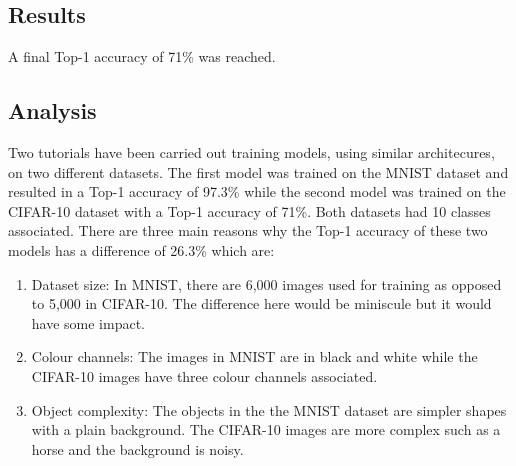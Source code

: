 \tocless\subsection{Results}
A final Top-1 accuracy of 71\% was reached.

\tocless\subsection{Analysis}
Two tutorials have been carried out training models, using similar architecures, on two different datasets.
The first model was trained on the MNIST dataset and resulted in a Top-1 accuracy of 97.3\% while the second model was trained on the CIFAR-10 dataset with a Top-1 accuracy of 71\%.
Both datasets had 10 classes associated.
There are three main reasons why the Top-1 accuracy of these two models has a difference of 26.3\% which are:
\begin{enumerate}
    \item{Dataset size: In MNIST, there are 6,000 images used for training as opposed to 5,000 in CIFAR-10. The difference here would be miniscule but it would have some impact.}
    \item{Colour channels: The images in MNIST are in black and white while the CIFAR-10 images have three colour channels associated.}
    \item{Object complexity: The objects in the the MNIST dataset are simpler shapes with a plain background. The CIFAR-10 images are more complex such as a horse and the background is noisy.}
\end{enumerate}

